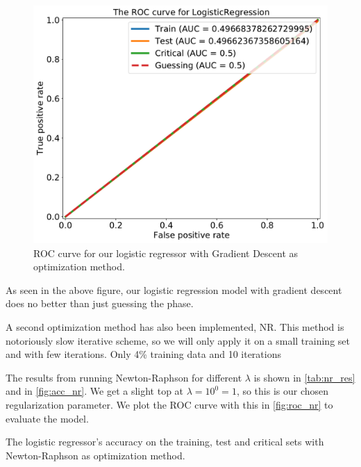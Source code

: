 \begin{figure}[H]
\begin{center}\includegraphics[scale=0.5]{latex/figures/logistic_roc_curve_gd.pdf}
\end{center}
\caption{ROC curve for our logistic regressor with Gradient Descent as optimization method.}
\label{fig:roc_gd}
\end{figure}

As seen in the above figure, our logistic regression model with gradient descent does no better than just guessing the phase.

A second optimization method has also been implemented, NR.
This method is notoriously slow iterative scheme, so we will only apply it on a small training set and with few iterations. Only 4\% training data and 10 iterations 

The results from running Newton-Raphson for different $\lambda$ is shown in \cref{tab:nr_res} and in \autoref{fig:acc_nr}. We get a slight top at $\lambda = 10^0=1$, so this is our chosen regularization parameter. We plot the ROC curve with this in \autoref{fig:roc_nr} to evaluate the model.


\begin{table}[H]
\caption{The logistic regressor's accuracy on the training, test and critical sets with Newton-Raphson as optimization method.}
\centering
{}

\label{tab:nr_res}
\end{table}

